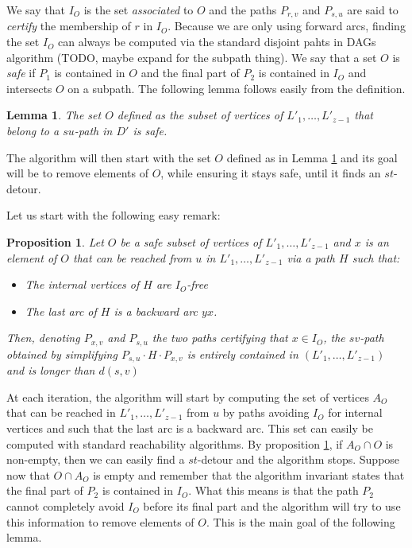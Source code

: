\documentclass[utf8,11pt]{article}
\theoremstyle{plain}
\newtheorem{lemma}[theorem]{Lemma}
\newtheorem{proposition}[theorem]{Proposition}
\theoremstyle{definition}
\begin{document}
We say that $I_O$ is the set \textit{associated} to $O$ and the paths $P_{r,v}$ and $ P_{s,u}$ are said to \textit{certify} the membership of $r$ in $I_O$.
Because we are only using forward arcs, finding the set $I_O$ can always be computed via the standard disjoint pahts in DAGs algorithm (TODO, maybe expand for the subpath thing). We say that a set $O$ is \textit{safe} if $P_1$ is contained in $O$ and the final part of $P_2$ is contained in $I_O$ and intersects $O$ on a subpath. The following lemma follows easily from the definition. 

\begin{lemma}\label{lem:start_O}
   The set $O$ defined as the subset of vertices of $L'_1, \dots, L'_{z-1}$ that belong to a $su$-path in $D'$ is safe.
\end{lemma}

The algorithm will then start with the set $O$ defined as in Lemma \ref{lem:start_O} and its goal will be to remove elements of $O$, while ensuring it stays safe, until it finds an $st$-detour.

Let us start with the following easy remark:

\begin{proposition}\label{pro:IO}
   Let $O$ be a safe subset of vertices of $L'_1, \dots, L'_{z-1}$ and $x$ is an element of $O$ that can be reached from $u$ in $L'_1, \dots, L'_{z-1}$ via a path $H$ such that: 
   \begin{itemize}
    \item The internal vertices of $H$ are $I_O$-free
    \item The last arc of $H$ is a backward arc $yx$.
   \end{itemize}
   Then, denoting $P_{x,v}$ and $P_{s,u}$ the two paths certifying that $x \in I_O$, the $sv$-path obtained by simplifying $P_{s,u} \cdot H \cdot P_{x,v}$ is entirely contained in $(L'_1, \dots, L'_{z-1})$ and is longer than $d(s,v)$
\end{proposition}

At each iteration, the algorithm will start by computing the set of vertices $A_O$ that can be reached in $L'_1, \dots, L'_{z-1}$ from $u$ by paths avoiding $I_O$ for internal vertices and such that the last arc is a backward arc. This set can easily be computed with standard reachability algorithms. By proposition \ref{pro:IO}, if $A_O \cap O$ is non-empty, then we can easily find a $st$-detour and the algorithm stops. Suppose now that $O \cap A_O$ is empty and remember that the algorithm invariant states that the final part of $P_2$ is contained in $I_O$. What this means is that the path $P_2$ cannot completely avoid $I_O$ before its final part and the algorithm will try to use this information to remove elements of $O$. This is the main goal of the following lemma. 
\end{document}
